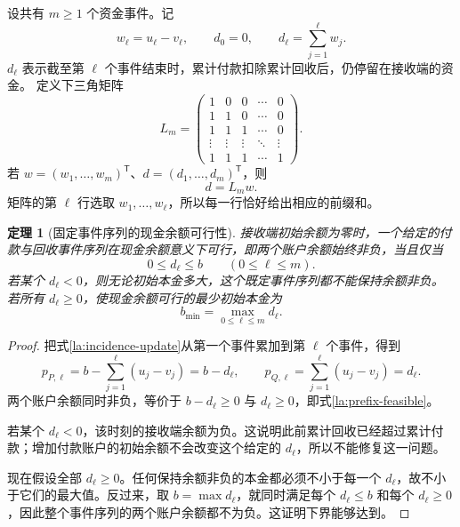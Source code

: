 \documentclass[UTF8,a4paper]{ctexbook}
\newtheorem{theorem}{定理}[chapter]
\theoremstyle{definition}
\numberwithin{equation}{chapter}
\newcommand{\1}{\mathbf{1}}
\begin{document}
设共有 $m\ge1$ 个资金事件。记
\[
w_\ell=u_\ell-v_\ell,
\qquad
d_0=0,\qquad d_\ell=\sum_{j=1}^{\ell}w_j.
\]
$d_\ell$ 表示截至第 $\ell$ 个事件结束时，累计付款扣除累计回收后，仍停留在接收端的资金。
定义下三角矩阵
\[
L_m=
\begin{pmatrix}
1&0&0&\cdots&0\\
1&1&0&\cdots&0\\
1&1&1&\cdots&0\\
\vdots&\vdots&\vdots&\ddots&\vdots\\
1&1&1&\cdots&1
\end{pmatrix}.
\]
若 $w=(w_1,\ldots,w_m)^{\mathsf T}$、$d=(d_1,\ldots,d_m)^{\mathsf T}$，则
\begin{equation}\label{la:prefix-matrix}
d=L_mw.
\end{equation}
矩阵的第 $\ell$ 行选取 $w_1,\ldots,w_\ell$，所以每一行恰好给出相应的前缀和。

\begin{theorem}[固定事件序列的现金余额可行性]\label{la:prefix-capital}
接收端初始余额为零时，一个给定的付款与回收事件序列在现金余额意义下可行，即两个账户余额始终非负，当且仅当
\begin{equation}\label{la:prefix-feasible}
0\le d_\ell\le b\qquad(0\le\ell\le m).
\end{equation}
若某个 $d_\ell<0$，则无论初始本金多大，这个既定事件序列都不能保持余额非负。若所有 $d_\ell\ge0$，使现金余额可行的最少初始本金为
\begin{equation}\label{la:prefix-max}
b_{\min}=\max_{0\le\ell\le m}d_\ell.
\end{equation}
\end{theorem}

\begin{proof}
把式\eqref{la:incidence-update}从第一个事件累加到第 $\ell$ 个事件，得到
\[
p_{P,\ell}=b-\sum_{j=1}^{\ell}(u_j-v_j)=b-d_\ell,
\qquad
p_{Q,\ell}=\sum_{j=1}^{\ell}(u_j-v_j)=d_\ell.
\]
两个账户余额同时非负，等价于 $b-d_\ell\ge0$ 与 $d_\ell\ge0$，即式\eqref{la:prefix-feasible}。

若某个 $d_\ell<0$，该时刻的接收端余额为负。这说明此前累计回收已经超过累计付款；增加付款账户的初始余额不会改变这个给定的 $d_\ell$，所以不能修复这一问题。

现在假设全部 $d_\ell\ge0$。任何保持余额非负的本金都必须不小于每一个 $d_\ell$，故不小于它们的最大值。反过来，取 $b=\max d_\ell$，就同时满足每个 $d_\ell\le b$ 和每个 $d_\ell\ge0$，因此整个事件序列的两个账户余额都不为负。这证明下界能够达到。
\end{proof}
\end{document}
